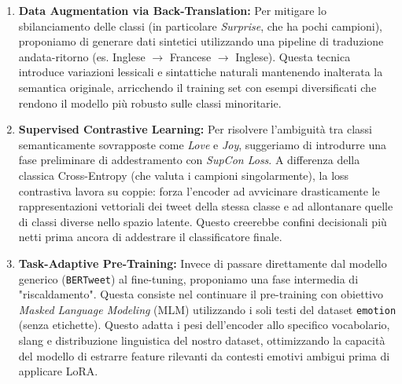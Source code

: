 \documentclass[a4paper,12pt]{article}
\begin{document}
\begin{enumerate}
    \item \textbf{Data Augmentation via Back-Translation:} Per mitigare lo sbilanciamento delle classi (in particolare \textit{Surprise}, che ha pochi campioni), proponiamo di generare dati sintetici utilizzando una pipeline di traduzione andata-ritorno (es. Inglese $\rightarrow$ Francese $\rightarrow$ Inglese). Questa tecnica introduce variazioni lessicali e sintattiche naturali mantenendo inalterata la semantica originale, arricchendo il training set con esempi diversificati che rendono il modello più robusto sulle classi minoritarie.

    \item \textbf{Supervised Contrastive Learning:} Per risolvere l'ambiguità tra classi semanticamente sovrapposte come \textit{Love} e \textit{Joy}, suggeriamo di introdurre una fase preliminare di addestramento con \textit{SupCon Loss}. A differenza della classica Cross-Entropy (che valuta i campioni singolarmente), la loss contrastiva lavora su coppie: forza l'encoder ad avvicinare drasticamente le rappresentazioni vettoriali dei tweet della stessa classe e ad allontanare quelle di classi diverse nello spazio latente. Questo creerebbe confini decisionali più netti prima ancora di addestrare il classificatore finale.

    \item \textbf{Task-Adaptive Pre-Training:} Invece di passare direttamente dal modello generico (\texttt{BERTweet}) al fine-tuning, proponiamo una fase intermedia di "riscaldamento". Questa consiste nel continuare il pre-training con obiettivo \textit{Masked Language Modeling} (MLM) utilizzando i soli testi del dataset \texttt{emotion} (senza etichette). Questo adatta i pesi dell'encoder allo specifico vocabolario, slang e distribuzione linguistica del nostro dataset, ottimizzando la capacità del modello di estrarre feature rilevanti da contesti emotivi ambigui prima di applicare LoRA.
\end{enumerate}

\newpage
\printbibliography[title={References}]
\end{document}

